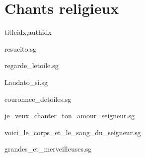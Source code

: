 \documentclass[
    ]{article}
\begin{document}
\section{Chants religieux}

\begin{songs}{titleidx,authidx}

{resucito.sg}


{regarde_letoile.sg}


{Laudato_si.sg}


{couronnee_detoiles.sg}


{je_veux_chanter_ton_amour_seigneur.sg}


{voici_le_corps_et_le_sang_du_seigneur.sg}


{grandes_et_merveilleuses.sg}



\end{songs}
\end{document}
